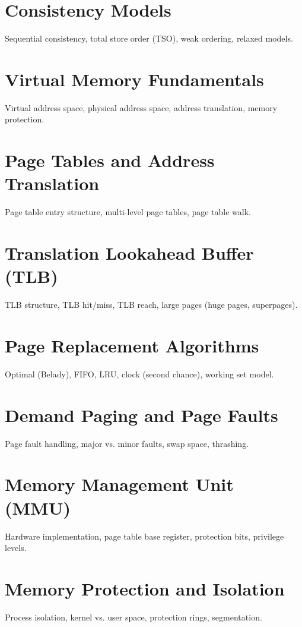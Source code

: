 \chapter{Consistency Models}
Sequential consistency, total store order (TSO), weak ordering, relaxed models.


\chapter{Virtual Memory Fundamentals}
Virtual address space, physical address space, address translation, memory protection.

\chapter{Page Tables and Address Translation}
Page table entry structure, multi-level page tables, page table walk.

\chapter{Translation Lookahead Buffer (TLB)}
TLB structure, TLB hit/miss, TLB reach, large pages (huge pages, superpages).

\chapter{Page Replacement Algorithms}
Optimal (Belady), FIFO, LRU, clock (second chance), working set model.

\chapter{Demand Paging and Page Faults}
Page fault handling, major vs. minor faults, swap space, thrashing.

\chapter{Memory Management Unit (MMU)}
Hardware implementation, page table base register, protection bits, privilege levels.

\chapter{Memory Protection and Isolation}
Process isolation, kernel vs. user space, protection rings, segmentation.

